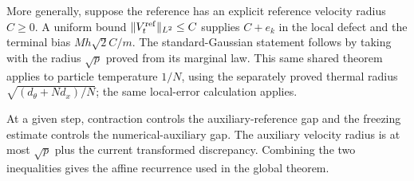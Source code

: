 \documentclass[11pt,a4paper]{article}
\begin{document}
More generally, suppose the reference has an explicit reference velocity radius \(C\ge0\). A uniform bound \(\|V_t^{\rm ref}\|_{L^2}\le C\) supplies \(C+e_k\) in the local defect and the terminal bias \(Mh\sqrt2C/m\). The standard-Gaussian statement follows by taking with the radius \(\sqrt p\) proved from its marginal law. This same shared theorem applies to particle temperature \(1/N\), using the separately proved thermal radius \(\sqrt{(d_\theta+Nd_x)/N}\); the same local-error calculation applies.



At a given step, contraction controls the auxiliary-reference gap and the freezing estimate controls the numerical-auxiliary gap. The auxiliary velocity radius is at most \(\sqrt p\) plus the current transformed discrepancy. Combining the two inequalities gives the affine recurrence used in the global theorem.
\end{document}
